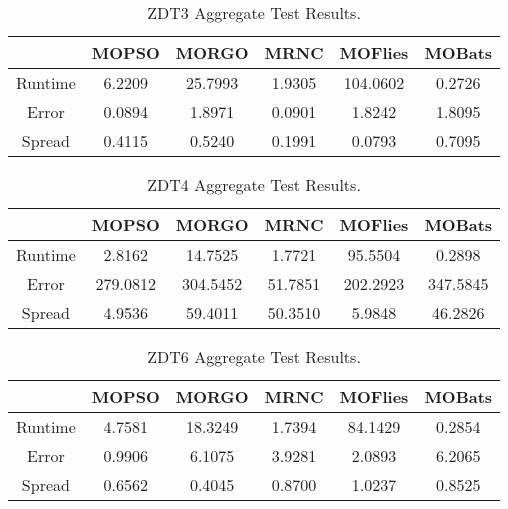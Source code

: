 \documentclass[letterpaper, 10 pt, conference]{ieeeconf}  %
\begin{document}
\vspace*{-\baselineskip} 

\begin{table}[h!]
\centering
 \begin{tabular}{||c c c c c c||} 
 \hline
 & MOPSO & MORGO & MRNC & MOFlies & MOBats \\
 \hline \hline
 Runtime & 6.2209 & 25.7993 & 1.9305 & 104.0602 & 0.2726 \\
 \hline
 Error & 0.0894 & 1.8971 & 0.0901 & 1.8242 & 1.8095 \\
 \hline
 Spread & 0.4115 & 0.5240  &  0.1991  &  0.0793   & 0.7095 \\
 \hline
\end{tabular}
\caption{ZDT3 Aggregate Test Results.}
\end{table}

\vspace*{-\baselineskip} 

\begin{table}[h!]
\centering
 \begin{tabular}{||c c c c c c||} 
 \hline
 & MOPSO & MORGO & MRNC & MOFlies & MOBats \\
 \hline \hline
 Runtime & 2.8162 & 14.7525 & 1.7721 & 95.5504 & 0.2898 \\
 \hline
 Error & 279.0812 & 304.5452 & 51.7851 & 202.2923 & 347.5845 \\
 \hline
 Spread & 4.9536 & 59.4011 & 50.3510 & 5.9848 & 46.2826 \\
 \hline
\end{tabular}
\caption{ZDT4 Aggregate Test Results.}
\end{table}

\vspace*{-\baselineskip} 

\begin{table}[h!]
\centering
 \begin{tabular}{||c c c c c c||} 
 \hline
 & MOPSO & MORGO & MRNC & MOFlies & MOBats \\
 \hline \hline
 Runtime & 4.7581  & 18.3249   & 1.7394 &  84.1429   & 0.2854 \\
 \hline
 Error & 0.9906  &  6.1075  &  3.9281  &  2.0893  &  6.2065 \\
 \hline
 Spread & 0.6562  &  0.4045  &  0.8700   & 1.0237  &  0.8525 \\
 \hline
\end{tabular}
\caption{ZDT6 Aggregate Test Results.}
\end{table}
\end{document}
